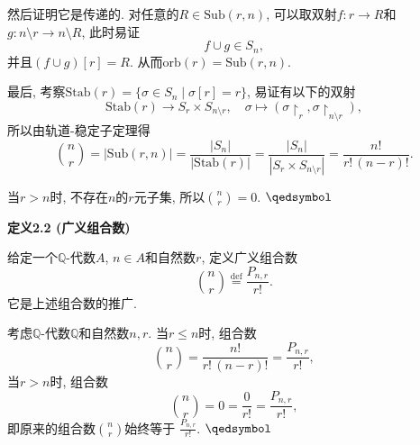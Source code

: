 \documentclass[UTF8]{ctexart}
\begin{document}
\vspace{3pt}
然后证明它是传递的. 对任意的$R\in\mathrm{Sub}(r,n)$,
可以取双射$f:r\to R$和$g:n\!\setminus\!r\to n\!\setminus\!R$, 此时易证
\[
    f\cup g\in S_n,
\]
并且$(f\cup g)[r]=R$. 从而$\mathrm{orb}(r)=\mathrm{Sub}(r,n)$.

\vspace{3pt}
最后, 考察$\mathrm{Stab}(r)=\{\sigma\in S_n\mid\sigma[r]=r\}$,
易证有以下的双射
\vspace{3pt}
\[
    \mathrm{Stab}(r)\to S_r\times S_{n\setminus r},\quad\sigma\mapsto
    (\sigma\!\!\restriction_r,\sigma\!\!\restriction_{n\setminus r}),
\]
所以由轨道-稳定子定理得
\vspace{3pt}
\[
    \binom{n}{r}=|\mathrm{Sub}(r,n)|=\frac{|S_n|}{|\mathrm{Stab}(r)|}=
    \frac{|S_n|}{|S_r\times S_{n\setminus r}|}=\frac{n!}{r!\,(n-r)!}.
\]

\vspace{5pt}
当$r>n$时, 不存在$n$的$r$元子集, 所以$\displaystyle\binom{n}{r}=0$.
\hfill $\qedsymbol$

\vspace{10pt}

\hypertarget{sec:定义2.2}{}
\noindent\textbf{定义2.2 (广义组合数)}

给定一个$\mathbb{Q}$-代数$A$, $n\in A$和自然数$r$, 定义广义组合数
\vspace{3pt}
\[
    \binom{n}{r}\overset{\mathrm{def}}{=}\frac{P_{n,r}}{r!}.
\]
它是上述组合数的推广.


考虑$\mathbb{Q}$-代数$\mathbb{Q}$和自然数$n,r$. 当$r\leqslant n$时, 组合数
\vspace{3pt}
\[
    \binom{n}{r}=\frac{n!}{r!\,(n-r)!}=\frac{P_{n,r}}{r!},
\]
当$r>n$时, 组合数
\[
    \binom{n}{r}=0=\frac{0}{r!}=\frac{P_{n,r}}{r!},
\]
即原来的组合数$\displaystyle\binom{n}{r}$始终等于
$\displaystyle\frac{P_{n,r}}{r!}$. \hfill $\qedsymbol$
\end{document}
